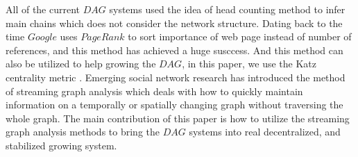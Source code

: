 All of the current $DAG$ systems used the idea of head counting method to infer main chains which does not consider the network structure.
Dating back to the time $Google$ uses $PageRank$ \cite{page1999pagerank} to sort importance of web page instead of number of references, and this method has achieved a huge susccess.
And this method can also be utilized to help growing the $DAG$, in this paper, we use the Katz centrality metric \cite{katz1953new}.
Emerging social network research has introduced the method of streaming graph analysis \cite{ediger2011tracking, green2012fast} which deals
with how to quickly maintain information on a temporally or spatially changing graph without traversing the whole graph. 
The main contribution of this paper is how to utilize the streaming graph analysis methods to bring the $DAG$ systems into real decentralized, and stabilized growing system.
